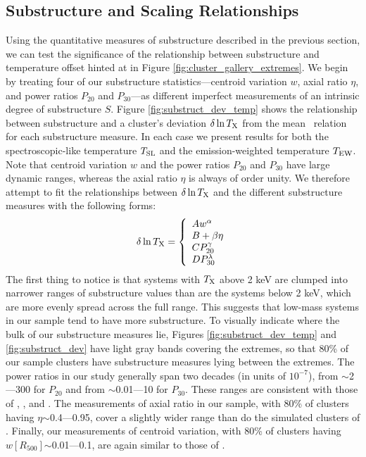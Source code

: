 \documentclass{aastex} \usepackage{natbib}
\begin{document}
\subsection{Substructure and Scaling Relationships}

Using the quantitative measures of substructure described in the
previous section, we can test the significance of the relationship
between substructure and temperature offset hinted at in Figure
\ref{fig:cluster_gallery_extremes}.  We begin by treating four of our
substructure statistics---centroid variation $w$, axial ratio $\eta$,
and power ratios $P_{20}$ and $P_{30}$---as different imperfect
measurements of an intrinsic degree of substructure $S$.  Figure
\ref{fig:substruct_dev_temp} shows the relationship between
substructure and a cluster's deviation $\delta \ln T_{\rm X}$ from the mean
\mtx\ relation for each substructure measure.  In each case we present
results for both the spectroscopic-like temperature $T_{\rm SL}$ and the
emission-weighted temperature $T_{\rm EW}$.  Note that centroid variation
$w$ and the power ratios $P_{20}$ and $P_{30}$ have large dynamic
ranges, whereas the axial ratio $\eta$ is always of order unity.  We
therefore attempt to fit the relationships between $\delta \ln T_{\rm X}$
and the different substructure measures with the following forms:
\begin{equation}
  \delta \ln T_{\rm X} = \left\{
  \begin{array}{l}
    A w^{\alpha} \\
    B + \beta\eta \\
    C P_{20}^{\gamma} \\
    D P_{30}^{\lambda}
   \end{array} \right.
\end{equation}
The first thing to notice is that systems with $T_{\rm X}$ above 2 keV are
clumped into narrower ranges of substructure values than are the
systems below 2 keV, which are more evenly spread across the full
range.  This suggests that low-mass systems in our sample tend to have
more substructure.  To visually indicate where the bulk of our
substructure measures lie, Figures \ref{fig:substruct_dev_temp} and
\ref{fig:substruct_dev} have light gray bands covering the extremes, so
that 80\% of our sample clusters have substructure measures lying
between the extremes.  The power ratios in our study generally span
two decades (in units of $10^{-7}$), from $\sim$2---300 for $P_{20}$
and from $\sim$0.01---10 for $P_{30}$.  These ranges are consistent
with those of \cite{1995ApJ...452..522B}, \cite{2006ApJ...639...64O},
and \cite{2007arXiv0708.1518J}.  The measurements of axial ratio in
our sample, with 80\% of clusters having $\eta$$\sim$0.4---0.95, cover
a slightly wider range than do the simulated clusters of
\cite{2006ApJ...639...64O}.  Finally, our measurements of centroid
variation, with 80\% of clusters having $w[R_{500}]$$\sim$0.01---0.1,
are again similar to those of \cite{2006ApJ...639...64O}.
\end{document}
